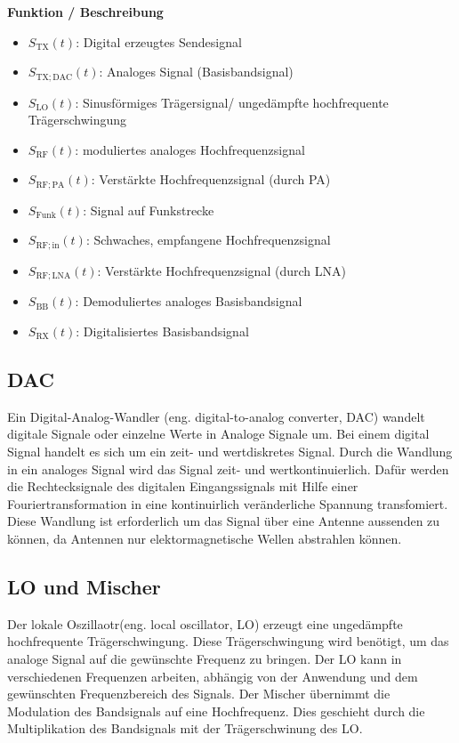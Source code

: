 \begin{minipage}{0.48\textwidth}
    \raggedright
    \textbf{\large Funktion / Beschreibung}\\[2ex]
    \begin{itemize}
        \item $S_{\mathrm{TX}}(t)$: Digital erzeugtes Sendesignal
        \item $S_{\mathrm{TX;DAC}}(t)$: Analoges Signal (Basisbandsignal)
        \item $S_{\mathrm{LO}}(t)$: Sinusförmiges Trägersignal/ ungedämpfte hochfrequente Trägerschwingung
        \item $S_{\mathrm{RF}}(t)$: moduliertes analoges Hochfrequenzsignal
        \item $S_{\mathrm{RF;PA}}(t)$: Verstärkte Hochfrequenzsignal (durch PA)
        \item $S_{\mathrm{Funk}}(t)$: Signal auf Funkstrecke
        \item $S_{\mathrm{RF;in}}(t)$: Schwaches, empfangene Hochfrequenzsignal
        \item $S_{\mathrm{RF;LNA}}(t)$: Verstärkte Hochfrequenzsignal (durch LNA)
        \item $S_{\mathrm{BB}}(t)$: Demoduliertes analoges Basisbandsignal
        \item $S_{\mathrm{RX}}(t)$: Digitalisiertes Basisbandsignal
    \end{itemize}
\end{minipage}



\subsection{DAC}
Ein Digital-Analog-Wandler (eng. digital-to-analog converter, DAC) wandelt digitale Signale oder einzelne Werte in Analoge
Signale um. Bei einem digital Signal handelt es sich um ein zeit- und wertdiskretes Signal. Durch die Wandlung
in ein analoges Signal wird das Signal zeit- und wertkontinuierlich.  Dafür werden die Rechtecksignale des digitalen Eingangssignals mit Hilfe einer Fouriertransformation
in eine  kontinuirlich veränderliche Spannung transfomiert. Diese Wandlung ist erforderlich um das Signal über eine
Antenne aussenden zu können, da Antennen nur elektormagnetische Wellen abstrahlen können. 
\\

\subsection{LO und Mischer}
Der lokale Oszillaotr(eng. local oscillator, LO) erzeugt eine ungedämpfte hochfrequente Trägerschwingung. Diese Trägerschwingung 
wird benötigt, um das analoge Signal auf die gewünschte Frequenz zu bringen. Der LO kann in verschiedenen Frequenzen arbeiten,
abhängig von der Anwendung und dem gewünschten Frequenzbereich des Signals. Der Mischer übernimmt die Modulation des
Bandsignals auf eine Hochfrequenz. Dies geschieht durch die Multiplikation des Bandsignals mit der Trägerschwinung des LO.

